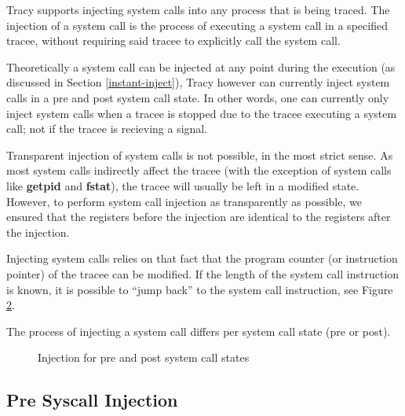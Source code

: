 \documentclass[a4paper, 10pt]{report}
\begin{document}
Tracy supports injecting system calls into any process that is being traced.
The injection of a system call is the process of executing a system call in
a specified tracee, without requiring said tracee to explicitly call the
system call.

Theoretically a system call can be injected at any point during
the execution (as discussed in Section \ref{instant-inject}),
Tracy however can currently inject system calls in a pre and post
system call state. In other words, one can currently only inject system calls
when a tracee is stopped due to the tracee executing a system call; not if
the tracee is recieving a signal.

Transparent injection of system calls is not possible, in the most strict sense.
As most system calls indirectly affect the tracee (with the exception of system
calls like \textbf{getpid} and \textbf{fstat}), the tracee will usually
be left in a modified state. However, to perform system call injection as
transparently as possible, we ensured that the registers before the injection
are identical to the registers after the injection.

Injecting system calls relies on that fact that the program counter (or
instruction pointer) of the tracee can be modified. If the length of the system
call instruction is known, it is possible to ``jump back'' to the system call
instruction, see Figure \ref{fig:asm-jump}.


The process of injecting a system call differs per system call state (pre or
post).

\begin{figure}
    \centering
    \hspace{1em}
    \caption{Injection for pre and post system call states}
    \label{fig:injection}
\end{figure}

\begin{figure}
    \caption{} %
    \label{fig:asm-jump}
\end{figure}

\subsection{Pre Syscall Injection}
\end{document}
